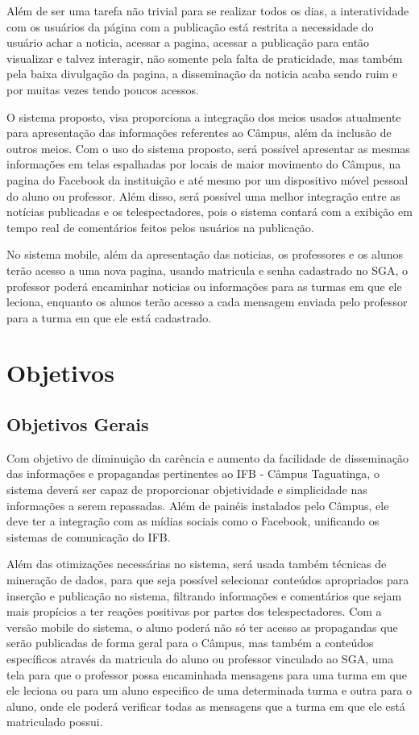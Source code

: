 Além de ser uma tarefa não
trivial para se realizar todos os dias, a interatividade com os usuários da página com a
publicação está restrita a necessidade do usuário achar a noticia, acessar a pagina, acessar
a publicação para então visualizar e talvez interagir, não somente pela falta de praticidade,
mas também pela baixa divulgação da pagina, a disseminação da noticia acaba
sendo ruim e por muitas vezes tendo poucos acessos.



O sistema proposto, visa proporciona a integração dos meios usados atualmente
para apresentação das informações referentes ao Câmpus, além da inclusão de outros
meios. Com o uso do sistema proposto, será possível apresentar as mesmas informações
em telas espalhadas por locais de maior movimento do Câmpus, na pagina do Facebook
da instituição e até mesmo por um dispositivo móvel pessoal do aluno ou professor. Além
disso, será possível uma melhor integração entre as notícias publicadas e os telespectadores,
pois o sistema contará com a exibição em tempo real de comentários feitos pelos
usuários na publicação.

No sistema mobile, além da apresentação das noticias, os professores e os alunos
terão acesso a uma nova pagina, usando matricula e senha cadastrado no SGA, o professor
poderá encaminhar noticias ou informações para as turmas em que ele leciona, enquanto
os alunos terão acesso a cada mensagem enviada pelo professor para a turma em que ele
está cadastrado.


\section{Objetivos}
\subsection{Objetivos Gerais}
Com objetivo de diminuição da carência e aumento da facilidade de disseminação
das informações e propagandas pertinentes ao IFB - Câmpus Taguatinga, o sistema deverá
ser capaz de proporcionar objetividade e simplicidade nas informações a serem repassadas.
Além de painéis instalados pelo Câmpus, ele deve ter a integração com as mídias sociais
como o Facebook, unificando os sistemas de comunicação do IFB.


Além das otimizações necessárias no sistema, será usada também técnicas de mineração
de dados, para que seja possível selecionar conteúdos apropriados para inserção
e publicação no sistema, filtrando informações e comentários que sejam mais propícios a
ter reações positivas por partes dos telespectadores. Com a versão mobile do sistema, o
aluno poderá não só ter acesso as propagandas que serão publicadas de forma geral para o
Câmpus, mas também a conteúdos específicos através da matricula do aluno ou professor
vinculado ao SGA, uma tela para que o professor possa encaminhada mensagens para
uma turma em que ele leciona ou para um aluno especifico de uma determinada turma e
outra para o aluno, onde ele poderá verificar todas as mensagens que a turma em que ele
está matriculado possui.

